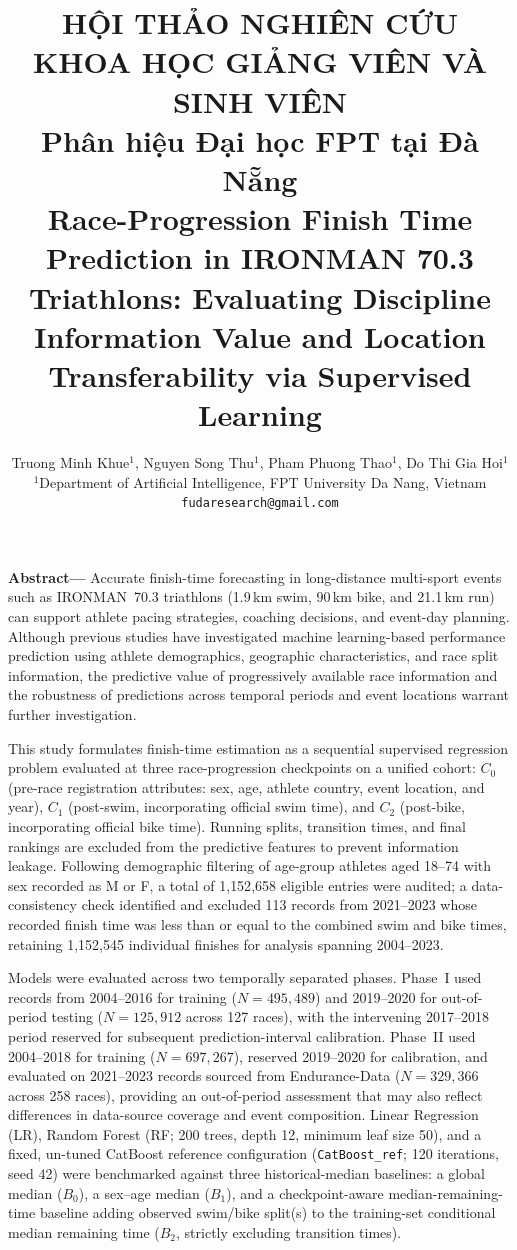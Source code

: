 \documentclass[10pt,a4paper,onecolumn]{article}
\title{\vspace{-1.5em}\normalsize\textbf{HỘI THẢO NGHIÊN CỨU KHOA HỌC GIẢNG VIÊN VÀ SINH VIÊN}\\
\small Phân hiệu Đại học FPT tại Đà Nẵng\\[1.3em]
\Large\bfseries Race-Progression Finish Time Prediction in IRONMAN 70.3 Triathlons: Evaluating Discipline Information Value and Location Transferability via Supervised Learning}
\author{Truong Minh Khue$^1$, Nguyen Song Thu$^1$, Pham Phuong Thao$^1$, Do Thi Gia Hoi$^1$\\
\small $^1$Department of Artificial Intelligence, FPT University Da Nang, Vietnam\\
\small \texttt{fudaresearch@gmail.com}}
\date{}
\begin{document}
\maketitle
\vspace{-1.5em}

\noindent\textbf{Abstract---} Accurate finish-time forecasting in long-distance multi-sport events such as IRONMAN~70.3 triathlons (1.9\,km swim, 90\,km bike, and 21.1\,km run) can support athlete pacing strategies, coaching decisions, and event-day planning. Although previous studies have investigated machine learning-based performance prediction using athlete demographics, geographic characteristics, and race split information, the predictive value of progressively available race information and the robustness of predictions across temporal periods and event locations warrant further investigation.

This study formulates finish-time estimation as a sequential supervised regression problem evaluated at three race-progression checkpoints on a unified cohort: $C_0$ (pre-race registration attributes: sex, age, athlete country, event location, and year), $C_1$ (post-swim, incorporating official swim time), and $C_2$ (post-bike, incorporating official bike time). Running splits, transition times, and final rankings are excluded from the predictive features to prevent information leakage. Following demographic filtering of age-group athletes aged 18--74 with sex recorded as M or F, a total of 1{,}152{,}658 eligible entries were audited; a data-consistency check identified and excluded 113 records from 2021--2023 whose recorded finish time was less than or equal to the combined swim and bike times, retaining 1{,}152{,}545 individual finishes for analysis spanning 2004--2023.

Models were evaluated across two temporally separated phases. Phase~I used records from 2004--2016 for training ($N=495{,}489$) and 2019--2020 for out-of-period testing ($N=125{,}912$ across 127 races), with the intervening 2017--2018 period reserved for subsequent prediction-interval calibration. Phase~II used 2004--2018 for training ($N=697{,}267$), reserved 2019--2020 for calibration, and evaluated on 2021--2023 records sourced from Endurance-Data ($N=329{,}366$ across 258 races), providing an out-of-period assessment that may also reflect differences in data-source coverage and event composition. Linear Regression (LR), Random Forest (RF; 200 trees, depth 12, minimum leaf size 50), and a fixed, un-tuned CatBoost reference configuration (\texttt{CatBoost\_ref}; 120 iterations, seed 42) were benchmarked against three historical-median baselines: a global median ($B_0$), a sex--age median ($B_1$), and a checkpoint-aware median-remaining-time baseline adding observed swim/bike split(s) to the training-set conditional median remaining time ($B_2$, strictly excluding transition times).
\end{document}
